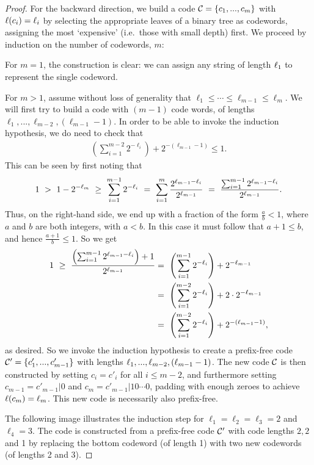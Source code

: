 \begin{proof}
For the backward direction, we build a code ${\cal C} = \{c_1, ..., c_m\}$ with $\ell(c_i) = \ell_i$ by selecting the appropriate leaves of a binary tree as codewords, assigning the most `expensive' (i.e.\ those with small depth) first. We proceed by induction on the number of codewords, $m$:

For $m = 1$, the construction is clear: we can assign any string of length $\ell_1$ to represent the single codeword.

For $m > 1$, assume without loss of generality that $\ell_1 \leq \cdots \leq \ell_{m-1} \leq \ell_{m}$. We will first try to build a code with $(m-1)$ code words, of lengths $\ell_1, ..., \ell_{m-2}, (\ell_{m-1} - 1)$. In order to be able to invoke the induction hypothesis, we do need to check that
\begin{align}
\left(\sum_{i=1}^{m-2} 2^{-\ell_{i}}\right) + 2^{-(\ell_{m-1} - 1)} \leq 1.
\end{align}
This can be seen by first noting that
\begin{align}
1 \ > \ 1 - 2^{-\len_m} \ \geq \ \sum_{i=1}^{m-1} 2^{-\len_i} \ = \ \sum_{i=1}^m \frac{2^{\len_{m-1} - \len_i}}{2^{\len_{m-1}}} \ = \ \frac{\sum_{i=1}^{m-1} 2^{\len_{m-1} - \len_i}}{2^{\len_{m-1}}}.
\end{align}
Thus, on the right-hand side, we end up with a fraction of the form $\frac{a}{b} < 1$, where $a$ and $b$ are both integers, with $a < b$. In this case it must follow that $a + 1 \leq b$, and hence $\frac{a+1}{b} \leq 1$. So we get
\begin{align}
1
\ \geq \ \frac{\left(\sum_{i=1}^{m-1} 2^{\ell_{m-1} - \ell_i}\right) + 1}{2^{\ell_{m-1}}}
&= \ \left(\sum_{i=1}^{m-1} 2^{-\ell_i}\right) + 2^{-\ell_{m-1}}\nonumber\\
&= \ \left(\sum_{i=1}^{m-2} 2^{-\ell_i}\right) + 2\cdot 2^{-\ell_{m-1}}\nonumber\\
&= \ \left(\sum_{i=1}^{m-2} 2^{-\ell_{i}}\right) + 2^{-(\ell_{m-1} - 1)},
\end{align}
as desired. So we invoke the induction hypothesis to create a prefix-free code ${\cal C}' = \{c'_1, ..., c'_{m-1}\}$ with lengths $\ell_1, ..., \ell_{m-2}, (\ell_{m-1} - 1)$. The new code ${\cal C}$ is then constructed by setting $c_i = c'_i$ for all $i \leq m-2$, and furthermore setting $c_{m-1} = c'_{m-1}|0$ and $c_m = c'_{m-1}|10\cdots 0$, padding with enough zeroes to achieve $\ell(c_m) = \ell_m$. This new code is necessarily also prefix-free.

The following image illustrates the induction step for $\ell_1 = \ell_2 = \ell_3 = 2$ and $\ell_4 = 3$. The code is constructed from a prefix-free code ${\cal C}'$ with code lengths $2, 2$ and 1 by replacing the bottom codeword (of length 1) with two new codewords (of lengths 2 and 3).


\end{proof}
